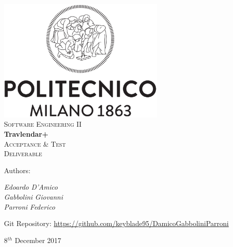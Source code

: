 \documentclass [11pt,a4paper,oneside,openany]{book} %
\begin{document}

\begin{titlepage}

 \begin{center} 
     \includegraphics[height=6cm]{logo.eps}\\
     \vspace{4em}
     {\Large \textsc{Software Engineering II}}\\
     \vspace{6em}
     {\LARGE \textbf{Travlendar+}}\\
     \vspace{3em}
     {\Large \textsc{Acceptance \& Test}}\\
     \vspace{1em}
     {\Large \textsc{Deliverable}}\\
 \end{center}
 
    \vskip 1cm
 
 	Authors:
 	\vspace{0.5em}
 	\begin{center}
      {\Large \textit{Edoardo D'Amico}}\\
      {\Large \textit{Gabbolini Giovanni}}\\
      {\Large \textit{Parroni Federico}}\\
    \end{center}

	\vskip 1.5cm    
    
    \begin{center}
    Git Repository: \url{https://github.com/keyblade95/DamicoGabboliniParroni}
	\end{center}

\vskip 2cm
\begin{center}
{\normalsize 8$^{th}$ December 2017}
\end{center}

\end{titlepage}
\end{document}
